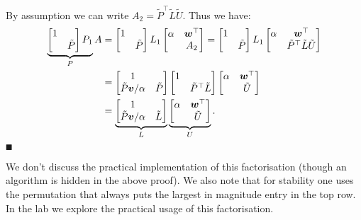 By assumption we can write $A_2 = \tilde{P}^\ensuremath{\top} \tilde{L} \tilde{U}$. Thus we have:
\begin{align*}
\underbrace{\begin{bmatrix} 1 \\
            & \tilde{P} \end{bmatrix} P_1}_P A &= \begin{bmatrix} 1 \\
            & \tilde{P} \end{bmatrix} L_1 \begin{bmatrix} \alpha & \bm{{\mbox{\boldmath$w$\unboldmath}}}^\top \\
                         & A_2
                        \end{bmatrix}  =
            \begin{bmatrix} 1 \\ & \tilde{P} \end{bmatrix} L_1  \begin{bmatrix} \alpha & \bm{{\mbox{\boldmath$w$\unboldmath}}}^\top \\  & \tilde{P}^\top \tilde{L}  \tilde{U} \end{bmatrix} \\
            &= \begin{bmatrix}
1 \\
\tilde{P} \bm{{\mbox{\boldmath$v$\unboldmath}}}/\alpha & \tilde{P} \end{bmatrix} \begin{bmatrix} 1 &  \\  &  \tilde{P}^\top \tilde{L}  \end{bmatrix}  \begin{bmatrix} \alpha & \bm{{\mbox{\boldmath$w$\unboldmath}}}^\top \\  &  \tilde{U} \end{bmatrix} \\
&= \underbrace{\begin{bmatrix}
1 \\
\tilde{P} \bm{{\mbox{\boldmath$v$\unboldmath}}}/\alpha & \tilde{L}  \end{bmatrix}}_L \underbrace{\begin{bmatrix} \alpha & \bm{{\mbox{\boldmath$w$\unboldmath}}}^\top \\  &  \tilde{U} \end{bmatrix}}_U. \\
\end{align*}
\ensuremath{\QED}

We don't discuss the practical implementation of this factorisation (though an algorithm is hidden in the above proof). We also note that for stability one uses the permutation that always puts the largest in magnitude entry in the top row. In the lab we explore the practical usage of this factorisation.



